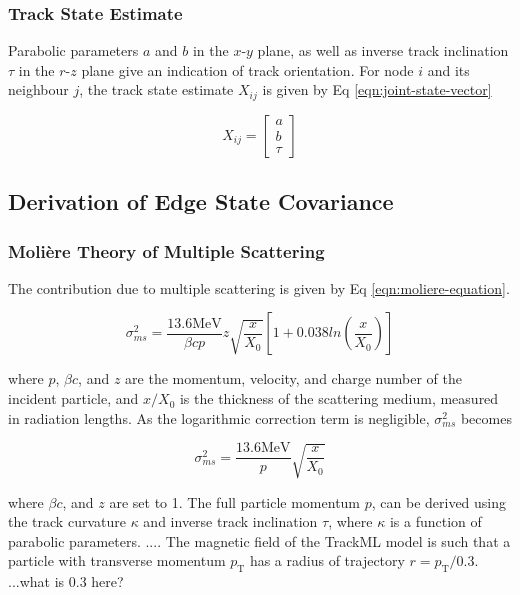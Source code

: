\subsubsection{Track State Estimate}

Parabolic parameters $a$ and $b$ in the $x$-$y$ plane, as well as inverse track inclination $\tau$ in the $r$-$z$ plane give an indication of track orientation. For node $i$ and its neighbour $j$, the track state estimate $X_{ij}$ is given by Eq \eqref{eqn:joint-state-vector}

\begin{equation}
X_{ij} = \begin{bmatrix} a \\ b \\ \tau \end{bmatrix}
\label{eqn:joint-state-vector}
\end{equation}






\subsection{Derivation of Edge State Covariance}

\subsubsection{Moli\`ere Theory of Multiple Scattering}

The contribution due to multiple scattering is given by Eq \eqref{eqn:moliere-equation}.

\begin{equation}
    \sigma_{ms}^{2} = \frac{13.6 \text{MeV}}{\beta c p} z \sqrt{\frac{x}{X_0}} \left[ 1 + 0.038ln \left( \frac{x}{X_0} \right) \right] 
    \label{eqn:moliere-equation}
\end{equation}

where $p$, $\beta c$, and $z$ are the momentum, velocity, and charge number of the incident particle, and $x/X_0$ is the thickness of the scattering medium, measured in radiation lengths. As the logarithmic correction term is negligible, $\sigma_{ms}^{2}$ becomes

\begin{equation}
    \sigma_{ms}^{2} = \frac{13.6 \text{MeV}}{p} \sqrt{\frac{x}{X_0}}
    \label{eqn:simplified-moliere-equation}
\end{equation}

where $\beta c$, and $z$ are set to 1. The full particle momentum $p$, can be derived using the track curvature $\kappa$ and inverse track inclination $\tau$, where $\kappa$ is a function of parabolic parameters. .... The magnetic field of the TrackML model is such that a particle with transverse momentum $p_\text{T}$ has a radius of trajectory $r = p_\text{T} / 0.3 $. ...what is 0.3 here?

